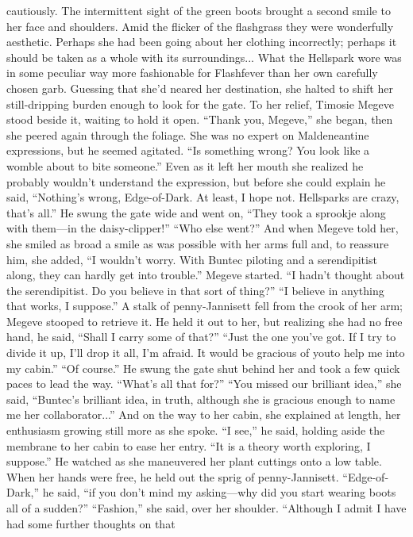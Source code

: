 \documentclass[9pt]{article}
\begin{document}
cautiously. The intermittent sight of the green boots brought a second smile to her face and shoulders.
Amid the flicker of the flashgrass they were wonderfully aesthetic. Perhaps she had been going about her
clothing incorrectly; perhaps it should be taken as a whole with its surroundings... What the Hellspark
wore was in some peculiar way more fashionable for Flashfever than her own carefully chosen garb.
Guessing that she’d neared her destination, she halted to shift her still-dripping burden enough to look
for the gate. To her relief, Timosie Megeve stood beside it, waiting to hold it open.
“Thank you, Megeve,” she began, then she peered again through the foliage. She was no expert on
Maldeneantine expressions, but he seemed agitated. “Is something wrong? You look like a womble
about to bite someone.”
Even as it left her mouth she realized he probably wouldn’t understand the expression, but before she
could explain he said, “Nothing’s wrong, Edge-of-Dark. At least, I hope not. Hellsparks are crazy, that’s
all.” He swung the gate wide and went on, “They took a sprookje along with them—in the
daisy-clipper!”
“Who else went?” And when Megeve told her, she smiled as broad a smile as was possible with her
arms full and, to reassure him, she added, “I wouldn’t worry. With Buntec piloting and a serendipitist
along, they can hardly get into trouble.”
Megeve started. “I hadn’t thought about the serendipitist. Do you believe in that sort of thing?”
“I believe in anything that works, I suppose.”
A stalk of penny-Jannisett fell from the crook of her arm; Megeve stooped to retrieve it. He held it
out to her, but realizing she had no free hand, he said, “Shall I carry some of that?”
“Just the one you’ve got. If I try to divide it up, I’ll drop it all, I’m afraid. It would be gracious of youto help me into my cabin.”
“Of course.” He swung the gate shut behind her and took a few quick paces to lead the way.
“What’s all that for?”
“You missed our brilliant idea,” she said, “Buntec’s brilliant idea, in truth, although she is gracious
enough to name me her collaborator...” And on the way to her cabin, she explained at length, her
enthusiasm growing still more as she spoke.
“I see,” he said, holding aside the membrane to her cabin to ease her entry. “It is a theory worth
exploring, I suppose.”
He watched as she maneuvered her plant cuttings onto a low table. When her hands were free, he
held out the sprig of penny-Jannisett. “Edge-of-Dark,” he said, “if you don’t mind my asking—why did
you start wearing boots all of a sudden?”
“Fashion,” she said, over her shoulder. “Although I admit I have had some further thoughts on that
\end{document}
